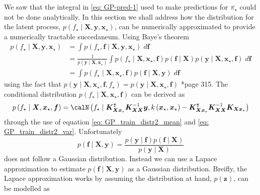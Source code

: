 We saw that the integral in \ref{eq: GP-pred-1} used to make predictions for $\overline{\pi_{\star}}$ could not be done analytically. In this section we shall address how the distribution for the latent process, $p \left( f_{\star} \mid \bm{X} , \bm{y} , \bm{x}_{\star} \right)$, can be numerically approximated to provide a numerically tractable succedaneum. Using Baye's theorem
\begin{align*}
    p \left( f_{\star} \mid \bm{X} , \bm{y} , \bm{x}_{\star} \right)
     & = \int p \left( f_{\star} , \bm{f} \mid \bm{X} , \bm{y} , \bm{x}_{\star} \right) \; d \bm{f}                                                                                                                                                       \\
     & = \frac{1}{p \left( \bm{y} \mid \bm{X} , \bm{x}_{\star} \right)} \int p \left( f_{\star} \mid \bm{X} , \bm{x}_{\star}, \bm{f} \right) p \left( \bm{f} \mid \bm{X} \right) p \left( \bm{y} \mid \bm{X} , \bm{x}_{\star}, \bm{f} \right) \; d \bm{f} \\
     & = \int p \left( f_{\star} \mid \bm{X} , \bm{x}_{\star}, \bm{f} \right) p \left( \bm{f} \mid \bm{X} , \bm{y} \right) \; d \bm{f}
\end{align*}
using the fact that $p \left( \bm{y} \mid \bm{X} , \bm{x}_{\star}, \bm{f}, f_{\star} \right) = p \left( \bm{y} \mid \bm{X} , \bm{x}_{\star}, \bm{f} \right)$ \cite{BishopChristopherM2006Pram, RasmussenCarlEdward2006Gpfm}*{page 315}. The conditional distribution $p \left( f_{\star} \mid \bm{X} , \bm{x}_{\star}, \bm{f} \right)$ can be derived as
\begin{equation*}
    p \left( f_{\star} \mid \bm{X} , \bm{x}_{\star}, \bm{f} \right) = \calN \left( f_{\star} \mid \bm{K}_{\bm{X} \bm{x}_{\star}}^{\intercal} \bm{K}_{\bm{X} \bm{X}}^{-1} \bm{y}, k \left( \bm{x}_{\star}, \bm{x}_{\star} \right) - \bm{K}_{\bm{X} \bm{x}_{\star}}^{\intercal} \bm{K}_{\bm{X} \bm{X}}^{-1} \bm{K}_{\bm{X} \bm{x}_{\star}} \right)
\end{equation*}
through the use of equation \ref{eq: GP_train_distr2_mean} and \ref{eq: GP_train_distr2_var}. Unfortunately
\begin{equation*}
    p \left( \bm{f} \mid \bm{X} , \bm{y} \right) = \frac{p \left( \bm{y} \mid \bm{f} \right) p \left( \bm{f} \mid \bm{X} \right) }{p \left( \bm{y} \mid \bm{X} \right)}
\end{equation*}
does not follow a Gaussian distribution. Instead we can use a Lapace approximation to estimate $p \left( \bm{f} \mid \bm{X} , \bm{y} \right)$ as a Gaussian distribution. Breifly, the Lapace approximation works by assuming the distribution at hand, $p \left( \bm{z} \right)$, can be modelled as
